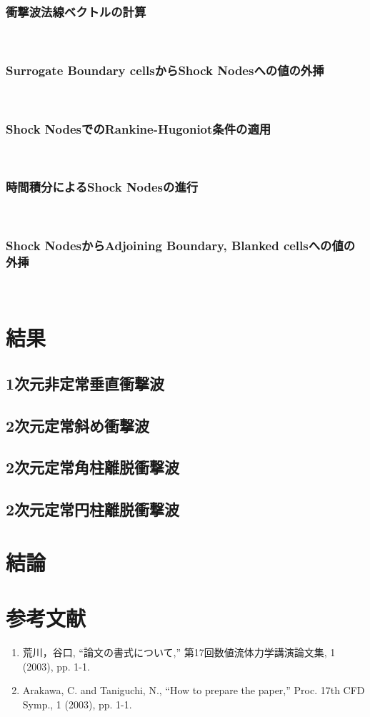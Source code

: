 \documentclass[a4j]{jarticle}
\begin{document}
\subsubsection{衝撃波法線ベクトルの計算} \label{subsubsec:normal}
\mbox{}\\[-1.0ex]


\subsubsection{Surrogate Boundary cellsからShock Nodesへの値の外挿} \label{subsubsec:extrapolate}
\mbox{}\\[-1.0ex]


\subsubsection{Shock NodesでのRankine-Hugoniot条件の適用} \label{subsubsec:rankine}
\mbox{}\\[-1.0ex]


\subsubsection{時間積分によるShock Nodesの進行} \label{subsubsec:prop}
\mbox{}\\[-1.0ex]


\subsubsection{Shock NodesからAdjoining Boundary, Blanked cellsへの値の外挿} \label{subsubsec:adjoining}
\mbox{}\\[-1.0ex]


\section{結果}
\subsection{1次元非定常垂直衝撃波}

\subsection{2次元定常斜め衝撃波}

\subsection{2次元定常角柱離脱衝撃波}

\subsection{2次元定常円柱離脱衝撃波}

\section{結論}

\section*{参考文献}

\begin{enumerate}
    \item 荒川，谷口, ``論文の書式について,'' 第17回数値流体力学講演論文集, 1 (2003), pp. 1-1.
    \item Arakawa, C. and Taniguchi, N., ``How to prepare the paper,'' Proc. 17th CFD Symp., 1 (2003), pp. 1-1.
\end{enumerate}
\end{document}
